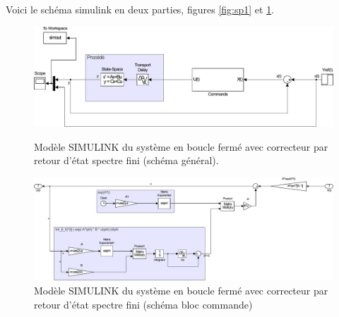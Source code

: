 Voici le schéma simulink en deux parties, figures \ref{fig:sp1} et \ref{fig:sp2}.

\begin{figure}[!ht]
	\begin{minipage}{.48\textwidth}
		\centering
		\includegraphics[width=\textwidth]{./III/images/sp1.pdf}
		\caption{\label{fig:sp1}Modèle SIMULINK du système en boucle fermé avec correcteur par retour d'état spectre fini (schéma général).}
	\end{minipage}\hfill
	\begin{minipage}{.48\textwidth}
		\centering
		\includegraphics[width=\textwidth]{./III/images/sp2.pdf}
		\caption{\label{fig:sp2}Modèle SIMULINK du système en boucle fermé avec correcteur par retour d'état spectre fini (schéma bloc commande)}
	\end{minipage}
\end{figure}



